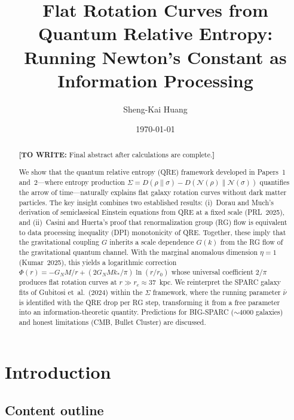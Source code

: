 \documentclass[prl,twocolumn,superscriptaddress,longbibliography,floatfix]{revtex4-2}
\newcommand{\chan}{\mathcal{N}}
\newcommand{\towrite}[1]{{\color{blue}\textbf{[TO WRITE:} #1\textbf{]}}}
\begin{document}
\title{Flat Rotation Curves from Quantum Relative Entropy:\\
Running Newton's Constant as Information Processing}

\author{Sheng-Kai Huang}

\date{\today}

\begin{abstract}
\towrite{Final abstract after calculations are complete.}

We show that the quantum relative entropy (QRE) framework developed
in Papers~1 and~2---where entropy production
$\Sigma = D(\rho\|\sigma) - D(\chan(\rho)\|\chan(\sigma))$ quantifies
the arrow of time---naturally explains flat galaxy rotation curves
without dark matter particles. The key insight combines two
established results: (i)~Dorau and Much's derivation of
semiclassical Einstein equations from QRE at a fixed scale
(PRL~2025), and (ii)~Casini and Huerta's proof that
renormalization group (RG) flow is equivalent to data processing
inequality (DPI) monotonicity of QRE. Together, these imply that
the gravitational coupling $G$ inherits a scale dependence
$G(k)$ from the RG flow of the gravitational quantum channel.
With the marginal anomalous dimension $\eta = 1$
(Kumar~2025), this yields a logarithmic correction
$\Phi(r) = -G_N M/r + (2G_N M k_*/\pi)\ln(r/r_0)$ whose
universal coefficient $2/\pi$ produces flat rotation curves
at $r \gg r_c \approx 37$~kpc. We reinterpret the SPARC
galaxy fits of Gubitosi et~al.\ (2024) within the $\Sigma$
framework, where the running parameter $\bar{\nu}$ is identified
with the QRE drop per RG step, transforming it from a free
parameter into an information-theoretic quantity. Predictions
for BIG-SPARC ($\sim 4000$ galaxies) and honest limitations
(CMB, Bullet Cluster) are discussed.
\end{abstract}

\maketitle

\section{Introduction}
\label{sec:intro}

\subsection*{Content outline}
\end{document}
